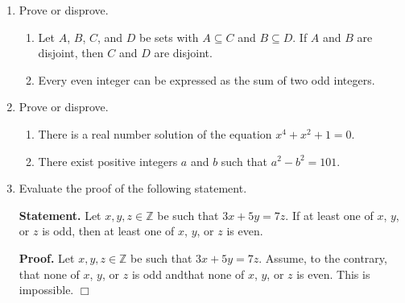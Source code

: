 \documentclass[12pt]{article}
\newcommand{\ZZ}{{\mathbb Z}}  %
\begin{document}
\begin{enumerate}
\item  Prove or disprove.
  \begin{enumerate}
    \item   Let $A$, $B$, $C$, and $D$ be sets with $A\subseteq C$ and $B\subseteq D$.
      If $A$ and $B$ are disjoint, then $C$ and $D$ are disjoint.

    \item Every even integer can be expressed as the sum of two odd integers.
  \end{enumerate}


\item  Prove or disprove.
  \begin{enumerate}
    \item  
  There is a real number solution of the equation $x^4+x^2+1=0$.
\item  
  There exist positive integers $a$ and $b$ such that $a^2-b^2=101$.
  \end{enumerate}
   


\item  Evaluate the proof of the following statement.

  {\bf Statement.} Let $x,y,z\in\ZZ$ be such that $3x+5y=7z$.
  If at least one of $x$, $y$, or $z$ is odd, then at least one of  $x$, $y$, or $z$ is even.

  {\bf Proof.}  Let $x,y,z\in\ZZ$ be such that $3x+5y=7z$.
  Assume, to the contrary, that none of  $x$, $y$, or $z$ is odd andthat none of  $x$, $y$, or $z$ is even.
  This is impossible.  \hfill$\Box$
  
   


  
\end{enumerate}
\end{document}
